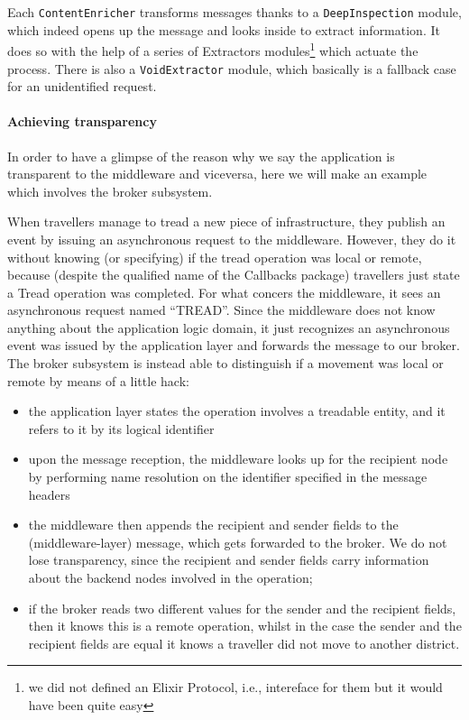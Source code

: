Each \texttt{ContentEnricher} transforms messages thanks to a
\texttt{DeepInspection} module, which indeed opens up the message and looks
inside to extract information.
It does so with the help of a series of Extractors modules\footnote{we did not
defined an Elixir Protocol, i.e., intereface for them but it would have been
quite easy} which actuate the process. There is also a \texttt{VoidExtractor}
module, which basically is a fallback case for an unidentified request.

\paragraph{Achieving transparency}
In order to have a glimpse of the reason why we say the application is
transparent to the middleware and viceversa, here we will make an example which
involves the broker subsystem.

When travellers manage to tread a new piece of infrastructure, they publish an
event by issuing an asynchronous request to the middleware. However, they do it
without knowing (or specifying) if the tread operation was local or remote,
because (despite the qualified name of the Callbacks package) travellers just
state a Tread operation was completed.
For what concers the middleware, it sees an asynchronous request named
``TREAD''. Since the middleware does not know anything about the application
logic domain, it just recognizes an asynchronous event was issued by the
application layer and forwards the message to our broker.
The broker subsystem is instead able to distinguish if a movement was local or
remote by means of a little hack:

\begin{itemize}
  \item the application layer states the operation involves a treadable entity,
    and it refers to it by its logical identifier
  \item upon the message reception, the middleware looks up for the recipient
    node by performing name resolution on the identifier specified in the
    message headers
  \item the middleware then appends the recipient and sender fields to the
    (middleware-layer) message, which gets forwarded to the broker. We do not
    lose transparency, since the recipient and sender fields carry information
    about the backend nodes involved in the operation;
  \item if the broker reads two different values for the sender and the
    recipient fields, then it knows this is a remote operation, whilst in the
    case the sender and the recipient fields are equal it knows a traveller did
    not move to another district.
\end{itemize}
